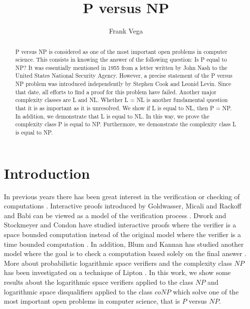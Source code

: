 \documentclass[a4paper,UKenglish,cleveref, autoref]{lipics-v2019}
\title{P versus NP} %
\author{Frank Vega}{Joysonic, Uzun Mirkova 5, Belgrade, 11000, Serbia} {vega.frank@gmail.com}{https://orcid.org/0000-0001-8210-4126}{}
\begin{document}
\maketitle

\begin{abstract}
P versus NP is considered as one of the most important open problems in computer science. This consists in knowing the answer of the following question: Is P equal to NP? It was essentially mentioned in 1955 from a letter written by John Nash to the United States National Security Agency. However, a precise statement of the P versus NP problem was introduced independently by Stephen Cook and Leonid Levin. Since that date, all efforts to find a proof for this problem have failed. Another major complexity classes are L and NL. Whether L = NL is another fundamental question that it is as important as it is unresolved. We show if L is equal to NL, then P = NP. In addition, we demonstrate that L is equal to NL. In this way, we prove the complexity class P is equal to NP. Furthermore, we demonstrate the complexity class L is equal to NP.
\end{abstract}

\section{Introduction}

In previous years there has been great interest in the verification or checking of computations \cite{LIP90}. Interactive proofs introduced by Goldwasser, Micali and Rackoff and Babi can be viewed as a model of the verification process \cite{LIP90}. Dwork and Stockmeyer and Condon have studied interactive proofs where the verifier is a space bounded computation instead of the original model where the verifier is a time bounded computation \cite{LIP90}. In addition, Blum and Kannan has studied another model where the goal is to check a computation based solely on the final answer \cite{LIP90}. More about probabilistic logarithmic space verifiers and the complexity class $NP$ has been investigated on a technique of Lipton \cite{LIP90}. In this work, we show some results about the logarithmic space verifiers applied to the class $NP$ and logarithmic space disqualifiers applied to the class $coNP$ which solve one of the most important open problems in computer science, that is $P$ versus $NP$.
\end{document}
